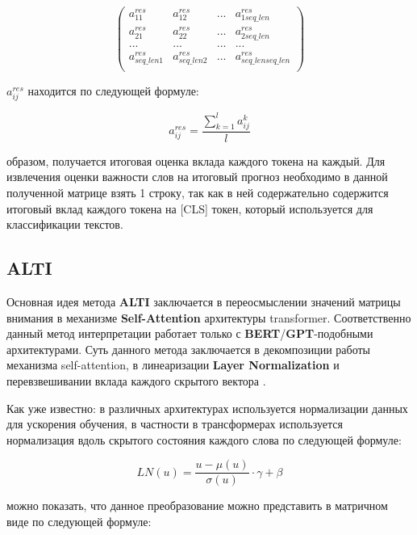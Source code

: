 \[
\begin{pmatrix}
a_{11}^{res} & a_{12}^{res} & ... & a_{1seq\_len}^{res} \\
a_{21}^{res} & a_{22}^{res} & ... & a_{2seq\_len}^{res} \\
... & ... & ... & ... \\
a_{seq\_len1}^{res} & a_{seq\_len2}^{res} & ... & a_{seq\_lenseq\_len}^{res} \\
\end{pmatrix}
\]

 $a_{ij}^{res}$ находится по следующей формуле:

\begin{equation*}
    a_{ij}^{res} = \frac{\sum_{k=1}^{l}a_{ij}^k}{l}
\end{equation*}

 образом, получается итоговая оценка вклада каждого токена на каждый. Для извлечения оценки важности слов на итоговый прогноз необходимо в данной полученной матрице взять 1 строку, так как в ней содержательно содержится итоговый вклад каждого токена на [CLS] токен, который используется для классификации текстов.

\subsection{ALTI}

\noindent\hspace{0.6cm}Основная идея метода \textbf{ALTI} заключается в переосмыслении значений матрицы внимания в механизме \textbf{Self-Attention} архитектуры transformer. Соответственно данный метод интерпретации работает только с \textbf{BERT}/\textbf{GPT}-подобными архитектурами. Суть данного метода заключается в декомпозиции работы механизма self-attention, в линеаризации \textbf{Layer Normalization} и перевзвешивании вклада каждого скрытого вектора \cite{optimization6}.

\noindent\hspace{0.6cm}Как уже известно: в различных архитектурах используется нормализации данных для ускорения обучения, в частности в трансформерах используется нормализация вдоль скрытого состояния каждого слова по следующей формуле:

\begin{equation*}
    LN(u) = \frac{u - \mu(u)}{\sigma(u)}\cdot\gamma + \beta
\end{equation*}

 можно показать, что данное преобразование можно представить в матричном виде по следующей формуле:

